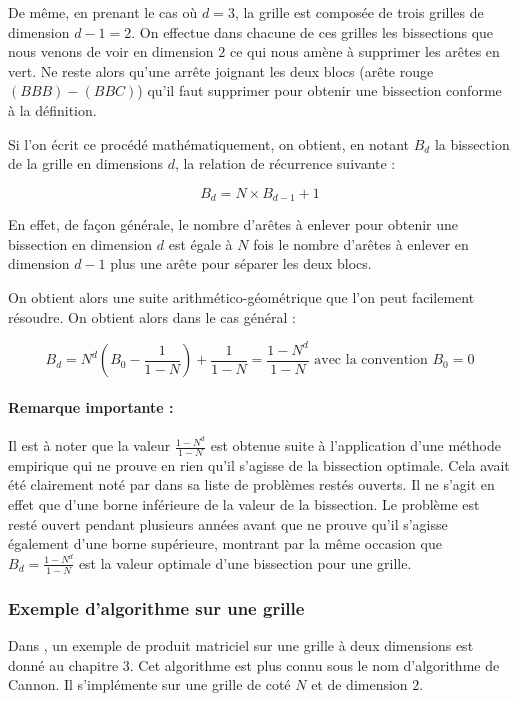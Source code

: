 De même, en prenant le cas où $d=3$, la grille est composée de trois grilles de dimension $d-1=2$. On effectue dans chacune de ces grilles les bissections que nous venons de voir en dimension $2$ ce qui nous amène à supprimer les arêtes en vert. Ne reste alors qu'une arrête joignant les deux blocs (arête rouge $(BBB)-(BBC)$) qu'il faut supprimer pour obtenir une bissection conforme à la définition.

Si l'on écrit ce procédé mathématiquement, on obtient, en notant $B_d$ la bissection de la grille en dimensions $d$, la relation de récurrence suivante :

$$B_d = N \times B_{d-1} + 1$$

En effet, de façon générale, le nombre d'arêtes à enlever pour obtenir une bissection en dimension $d$ est égale à $N$ fois le nombre d'arêtes à enlever en dimension $d-1$ plus une arête pour séparer les deux blocs.

On obtient alors une suite arithmético-géométrique que l'on peut facilement résoudre. On obtient alors dans le cas général :

$$B_d = N^d(B_0-\frac{1}{1-N}) + \frac{1}{1-N} = \frac{1-N^d}{1-N} \text{ avec la convention }B_0 = 0$$

\paragraph{Remarque importante :} Il est à noter que la valeur $\frac{1-N^d}{1-N}$ est obtenue suite à l'application d'une méthode empirique qui ne prouve en rien qu'il s'agisse de la bissection optimale. Cela avait été clairement noté par \cite{Leighton1992} dans sa liste de problèmes restés ouverts. Il ne s'agit en effet que d'une borne inférieure de la valeur de la bissection. Le problème est resté ouvert pendant plusieurs années avant que \cite{KE2007} ne prouve qu'il s'agisse également d'une borne supérieure, montrant par la même occasion que $B_d = \frac{1-N^d}{1-N}$ est la valeur optimale d'une bissection pour une grille.

\subsubsection{Exemple d'algorithme sur une grille}

Dans \cite{Leighton1992}, un exemple de produit matriciel sur une grille à deux dimensions est donné au chapitre 3. Cet algorithme est plus connu sous le nom d'algorithme de Cannon. Il s'implémente sur une grille de coté $N$ et de dimension $2$. 